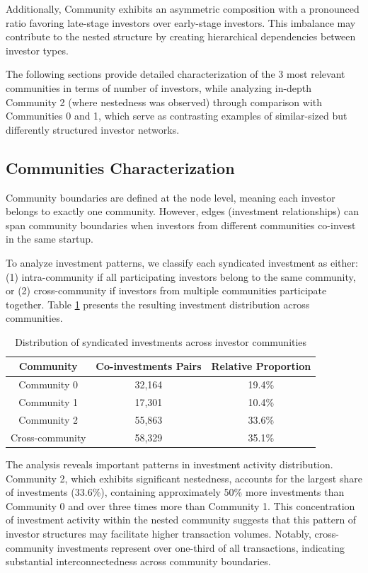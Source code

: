 Additionally, Community \interestingCommunity{} exhibits an asymmetric composition with a pronounced ratio favoring late-stage investors over early-stage investors. This imbalance may contribute to the nested structure by creating hierarchical dependencies between investor types.


The following sections provide detailed characterization of the 3 most relevant communities in terms of number of investors, while analyzing in-depth Community 2 (where nestedness was observed) through comparison with Communities 0 and 1, which serve as contrasting examples of similar-sized but differently structured investor networks.

\subsection{Communities Characterization}

Community boundaries are defined at the node level, meaning each investor belongs to exactly one community. However, edges (investment relationships) can span community boundaries when investors from different communities co-invest in the same startup.

To analyze investment patterns, we classify each syndicated investment as either: (1) intra-community if all participating investors belong to the same community, or (2) cross-community if investors from multiple communities participate together. Table \ref{tab:investment_distribution} presents the resulting investment distribution across communities.

\begin{table}[htbp]
\centering
\begin{tabular}{|c|c|c|}
\hline
\textbf{Community} & \textbf{Co-investments Pairs} & \textbf{Relative Proportion} \\
\hline
Community 0 & 32,164 & 19.4\% \\
Community 1 & 17,301 & 10.4\% \\
Community 2 & 55,863 & 33.6\% \\
Cross-community & 58,329 & 35.1\% \\
\hline
\end{tabular}
\caption{Distribution of syndicated investments across investor communities}
\label{tab:investment_distribution}
\end{table}

The analysis reveals important patterns in investment activity distribution. Community 2, which exhibits significant nestedness, accounts for the largest share of investments (33.6\%), containing approximately 50\% more investments than Community 0 and over three times more than Community 1. This concentration of investment activity within the nested community suggests that this pattern of investor structures may facilitate higher transaction volumes. Notably, cross-community investments represent over one-third of all transactions, indicating substantial interconnectedness across community boundaries.

